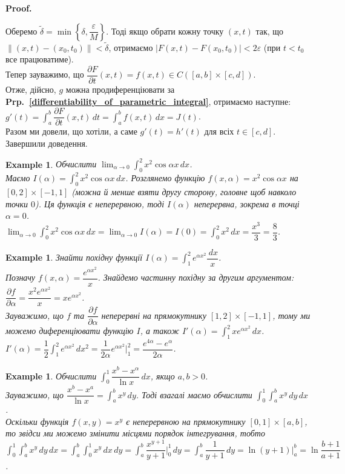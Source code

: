 \documentclass[a4paper, 10pt]{article}
\makeatletter
\def\departial#1#2{\dfrac{\partial {#1}}{\partial {#2}}}
\def\huge{\displaystyle}
\def\qed{$\blacksquare$}
\theoremstyle{theoremdd}
\theoremstyle{theoremdd}
\theoremstyle{theoremdd}
\theoremstyle{theoremdd}
\theoremstyle{theoremdd}
\newtheorem{example}[theorem]{Example}
\theoremstyle{theoremdd}
\theoremstyle{theoremdd}
\theoremstyle{theoremdd}
\theoremstyle{theoremdd}
\newcommand\prpref[1]{\textbf{Prp.~\ref{#1}}}
\renewenvironment{proof}[1][Proof.\\]{\par
\pushQED{\hfill \qed}%
\normalfont \topsep6\p@\@plus6\p@\relax
\trivlist
\item\relax
{\bfseries
#1\@addpunct{.}}\hspace\labelsep\ignorespaces
}{%
\popQED\endtrivlist\@endpefalse
}
\makeatother
\begin{document}
\begin{proof}
Оберемо $\tilde{\delta} = \min\left\{\delta,\dfrac{\varepsilon}{M}\right\}$. Тоді якщо обрати кожну точку $(x,t)$ так, що $\| (x,t) - (x_0,t_0) \| < \tilde{\delta}$, отримаємо $|F(x,t) - F(x_0,t_0)| < 2 \varepsilon$ (при $t < t_0$ все працюватиме).\\
Тепер зауважимо, що $\departial{F}{t}(x,t) = f(x,t) \in C([a,b] \times [c,d])$.\\
Отже, дійсно, $g$ можна продиференціювати за \prpref{differentiability_of_parametric_integral}, отримаємо наступне:\\
$g'(t) = \displaystyle\int_a^b \departial{F}{t}(x,t)\,dt = \int_a^b f(x,t)\,dx = J(t)$.\\
Разом ми довели, що хотіли, а саме $g'(t) = h'(t)$ для всіх $t \in [c,d]$. Завершили доведення.
\end{proof}

\begin{example}
Обчислити $\huge \lim_{\alpha \to 0} \int_0^2 x^2 \cos \alpha x \,dx$.\\
Маємо $I(\alpha) = \huge\int_0^2 x^2 \cos \alpha x \,dx$. Розглянемо функцію $f(x,\alpha) = x^2 \cos \alpha x$ на $[0,2] \times [-1,1]$ (можна й менше взяти другу сторону, головне щоб навколо точки $0$). Ця функція є неперервною, тоді $I(\alpha)$ неперервна, зокрема в точці $\alpha = 0$.\\
$\huge \lim_{\alpha \to 0} \int_0^2 x^2 \cos \alpha x \,dx = \lim_{\alpha \to 0} I(\alpha) = I(0) = \int_0^2 x^2 \,dx = \dfrac{x^3}{3} = \dfrac{8}{3}$.
\end{example}

\begin{example}
Знайти похідну функції $I(\alpha) = \huge\int_1^2 e^{\alpha x^2} \dfrac{\,dx}{x}$.\\
Позначу $f(x,\alpha) = \dfrac{e^{\alpha x^2}}{x}$. Знайдемо частинну похідну за другим аргументом: $\departial{f}{\alpha} = \dfrac{x^2 e^{\alpha x^2}}{x} = x e^{\alpha x^2}$.\\
Зауважимо, що $f$ та $\departial{f}{\alpha}$ неперервні на прямокутнику $[1,2] \times [-1,1]$, тому ми можемо диференціювати функцію $I$, а також $I'(\alpha) = \huge\int_1^2 x e^{\alpha x^2}\,dx$.\\
$I'(\alpha) = \huge \dfrac{1}{2} \int_1^2 e^{\alpha x^2}\,dx^2 = \dfrac{1}{2\alpha} e^{\alpha x^2} \Big|_1^2 = \dfrac{e^{4\alpha}-e^{\alpha}}{2\alpha}$.
\end{example}

\begin{example}
Обчислити $\huge\int_0^1 \dfrac{x^b - x^\alpha}{\ln x}\,dx$, якщо $a,b>0$.\\
Зауважимо, що $\dfrac{x^b - x^a}{\ln x} = \huge\int_a^b x^y\,dy$. Тоді взагалі маємо обчислити $\huge\int_0^1 \int_a^b x^y \,dy \,dx$.\\
Оскільки функція $f(x,y) = x^y$ є неперервною на прямокутнику $[0,1] \times [a,b]$, то звідси ми можемо змінити місцями порядок інтегрування, тобто\\
$\huge\int_0^1 \int_a^b x^y \,dy \,dx = \int_a^b \int_0^1 x^y\,dx\,dy = \int_a^b \dfrac{x^{y+1}}{y+1}\Big|_0^1\,dy = \int_a^b \dfrac{1}{y+1}\,dy = \ln (y+1) \Big|_a^b = \ln \dfrac{b+1}{a+1}$.
\end{example}
\end{document}
